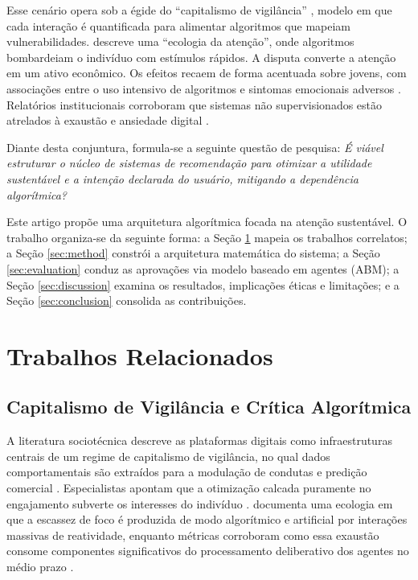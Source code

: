 Esse cenário opera sob a égide do ``capitalismo de vigilância'' \citep{zuboff2019}, modelo em que cada interação é quantificada para alimentar algoritmos que mapeiam vulnerabilidades. \citet{citton2017} descreve uma ``ecologia da atenção'', onde algoritmos bombardeiam o indivíduo com estímulos rápidos. A disputa converte a atenção em um ativo econômico. Os efeitos recaem de forma acentuada sobre jovens, com associações entre o uso intensivo de algoritmos e sintomas emocionais adversos \citep{costello2023}. Relatórios institucionais corroboram que sistemas não supervisionados estão atrelados à exaustão e ansiedade digital \citep{hai2021}. 

Diante desta conjuntura, formula-se a seguinte questão de pesquisa: \textit{É viável estruturar o núcleo de sistemas de recomendação para otimizar a utilidade sustentável e a intenção declarada do usuário, mitigando a dependência algorítmica?}

Este artigo propõe uma arquitetura algorítmica focada na atenção sustentável. O trabalho organiza-se da seguinte forma: a Seção \ref{sec:related} mapeia os trabalhos correlatos; a Seção \ref{sec:method} constrói a arquitetura matemática do sistema; a Seção \ref{sec:evaluation} conduz as aprovações via modelo baseado em agentes (ABM); a Seção \ref{sec:discussion} examina os resultados, implicações éticas e limitações; e a Seção \ref{sec:conclusion} consolida as contribuições.

\section{Trabalhos Relacionados} \label{sec:related}

\subsection{Capitalismo de Vigilância e Crítica Algorítmica}
A literatura sociotécnica descreve as plataformas digitais como infraestruturas centrais de um regime de capitalismo de vigilância, no qual dados comportamentais são extraídos para a modulação de condutas e predição comercial \citep{zuboff2019}. Especialistas apontam que a otimização calcada puramente no engajamento subverte os interesses do indivíduo \citep{harris2019}. \citet{citton2017} documenta uma ecologia em que a escassez de foco é produzida de modo algorítmico e artificial por interações massivas de reatividade, enquanto métricas corroboram como essa exaustão consome componentes significativos do processamento deliberativo dos agentes no médio prazo \citep{allcott2021}.

